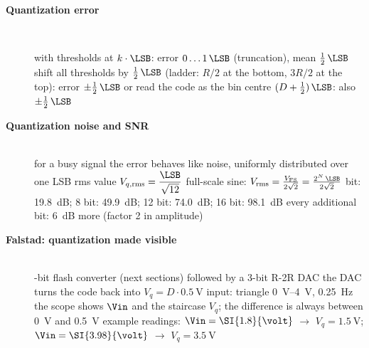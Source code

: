 \begin{description}
\item[{\rot\bf Quantization error}]~\\[-\lblskip]
\begin{center}
\end{center}
\bi
	\ite with thresholds at $k\cdot\LSB$: error $0 \ldots 1\,\LSB$ (truncation), mean $\frac12\,\LSB$
	\ite shift all thresholds by $\frac12\,\LSB$ (ladder: $R/2$ at the bottom, $3R/2$ at the top): error $\pm\frac12\,\LSB$
	\ite or read the code as the bin centre $(D+\frac12)\,\LSB$: also $\pm\frac12\,\LSB$
\ei
{}
\os{\newpage}

\item[{\rot\bf Quantization noise and SNR}]~\\[-\lblskip]
\bi
	\ite for a busy signal the error behaves like noise, uniformly distributed over one LSB
	\bi
		\itee rms value $\displaystyle V_{q,\mathrm{rms}} = \frac{\LSB}{\sqrt{12}}$
	\ei
	\ite full-scale sine: $V_\mathrm{rms} = \frac{V_\mathrm{FS}}{2\sqrt 2} = \frac{2^N\,\LSB}{2\sqrt2}$
\ei
{}
\bi
	 bit: \SI{19.8}{\dB}; 8 bit: \SI{49.9}{\dB}; 12 bit: \SI{74.0}{\dB}; 16 bit: \SI{98.1}{\dB}
	\ite every additional bit: \SI{6}{\dB} more (factor 2 in amplitude)
\ei
\os{\newpage}

\item[{\rot\bf Falstad: quantization made visible}]~\\[-\lblskip]
\bi
	-bit flash converter (next sections) followed by a 3-bit R-2R DAC
	\bi
		\itee the DAC turns the code back into $V_q = D\cdot\SI{0.5}{\volt}$
	\ei
	\ite input: triangle \SIrange{0}{4}{\volt}, \SI{0.25}{\hertz}
	\ite the scope shows $\Vin$ and the staircase $V_q$; the difference is always between \SI{0}{\volt} and \SI{0.5}{\volt}
	\ite example readings: $\Vin = \SI{1.8}{\volt}$ $\to$ $V_q = \SI{1.5}{\volt}$; $\Vin = \SI{3.98}{\volt}$ $\to$ $V_q = \SI{3.5}{\volt}$
\ei
{}
\os{\newpage}
\end{description}

